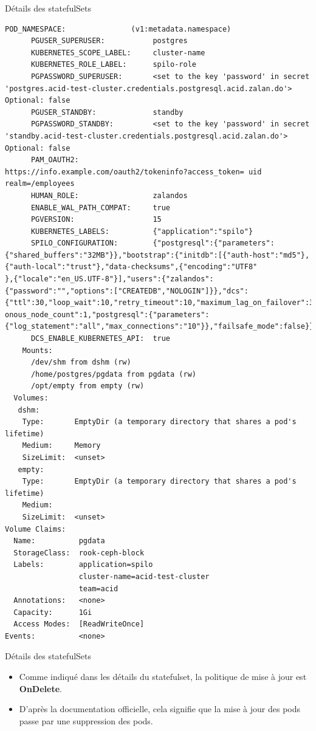 \begin{frame}[fragile,shrink=8]{Détails des statefulSets}
\begin{tiny}
\begin{Verbatim}[commandchars=\\\{\}]
      POD_NAMESPACE:               (v1:metadata.namespace)
      PGUSER_SUPERUSER:           postgres
      KUBERNETES_SCOPE_LABEL:     cluster-name
      KUBERNETES_ROLE_LABEL:      spilo-role
      PGPASSWORD_SUPERUSER:       <set to the key 'password' in secret 'postgres.acid-test-cluster.credentials.postgresql.acid.zalan.do'>  Optional: false
      PGUSER_STANDBY:             standby
      PGPASSWORD_STANDBY:         <set to the key 'password' in secret 'standby.acid-test-cluster.credentials.postgresql.acid.zalan.do'>  Optional: false
      PAM_OAUTH2:                 https://info.example.com/oauth2/tokeninfo?access_token= uid realm=/employees
      HUMAN_ROLE:                 zalandos
      ENABLE_WAL_PATH_COMPAT:     true
      PGVERSION:                  15
      KUBERNETES_LABELS:          {"application":"spilo"}
      SPILO_CONFIGURATION:        {"postgresql":{"parameters":{"shared_buffers":"32MB"}},"bootstrap":{"initdb":[{"auth-host":"md5"},{"auth-local":"trust"},"data-checksums",{"encoding":"UTF8"
},{"locale":"en_US.UTF-8"}],"users":{"zalandos":{"password":"","options":["CREATEDB","NOLOGIN"]}},"dcs":{"ttl":30,"loop_wait":10,"retry_timeout":10,"maximum_lag_on_failover":33554432,"synchr
onous_node_count":1,"postgresql":{"parameters":{"log_statement":"all","max_connections":"10"}},"failsafe_mode":false}}}
      DCS_ENABLE_KUBERNETES_API:  true
    Mounts:
      /dev/shm from dshm (rw)
      /home/postgres/pgdata from pgdata (rw)
      /opt/empty from empty (rw)
  Volumes:
   dshm:
    Type:       EmptyDir (a temporary directory that shares a pod's lifetime)
    Medium:     Memory
    SizeLimit:  <unset>
   empty:
    Type:       EmptyDir (a temporary directory that shares a pod's lifetime)
    Medium:     
    SizeLimit:  <unset>
Volume Claims:
  Name:          pgdata
  StorageClass:  rook-ceph-block
  Labels:        application=spilo
                 cluster-name=acid-test-cluster 
                 team=acid
  Annotations:   <none>
  Capacity:      1Gi
  Access Modes:  [ReadWriteOnce]
Events:          <none>

\end{Verbatim}
\end{tiny}

\end{frame}


\begin{frame}[fragile]{Détails des statefulSets}

   \begin{itemize}
      \item Comme indiqué dans les détails du statefulset, la politique de mise à jour est \textbf{OnDelete}.
      \item D'après la documentation officielle, cela signifie que la mise à jour des pods passe par une suppression des pods.
   \end{itemize}

\end{frame}

